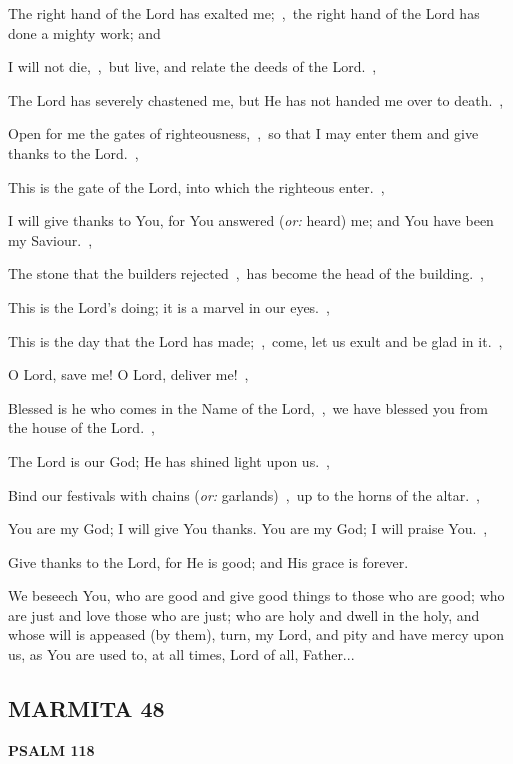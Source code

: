 \documentclass[12pt,twoside,a5paper]{article}
\newcommand{\marmita}[1]{\subsection*{MARMITA {#1}}}
\newcommand{\psalm}[1]{\textbf{PSALM {#1}}\nopagebreak}
\newcommand{\slota}[1]{\liturgicalhint{Slota.} #1}
\newcommand{\translationoption}[1]{\emph{or:} #1}
\begin{document}
\begin{normalparskip}
  The right hand of the Lord has exalted me;~\sep\ the right hand of the Lord has done a mighty work; and

  I will not die,~\sep\ but live, and relate the deeds of the Lord.~\sep

  The Lord has severely chastened me, but He has not handed me over to death.~\sep

  Open for me the gates of righteousness,~\sep\ so that I may enter them and give thanks to the Lord.~\sep

  This is the gate of the Lord, into which the righteous enter.~\sep

  I will give thanks to You, for You answered (\translationoption{heard}) me; and You have been my Saviour.~\sep

  The stone that the builders rejected~\sep\ has become the head of the building.~\sep

  This is the Lord's doing; it is a marvel in our eyes.~\sep

  This is the day that the Lord has made;~\sep\ come, let us exult and be glad in it.~\sep

  O Lord, save me! O Lord, deliver me!~\sep

  Blessed is he who comes in the Name of the Lord,~\sep\ we have blessed you from the house of the Lord.~\sep

  The Lord is our God; He has shined light upon us.~\sep

  Bind our festivals with chains (\translationoption{garlands})~\sep\ up to the horns of the altar.~\sep

  You are my God; I will give You thanks. You are my God; I will praise You.~\sep

  Give thanks to the Lord, for He is good; and His grace is forever.
\end{normalparskip}

\slota{We beseech You, who are good and give good things to those who are good; who are just and love those who are just; who are holy and dwell in the holy, and whose will is appeased (by them), turn, my Lord, and pity and have mercy upon us, as You are used to, at all times, Lord of all, Father...}

\marmita{48}

\psalm{118}
\end{document}
